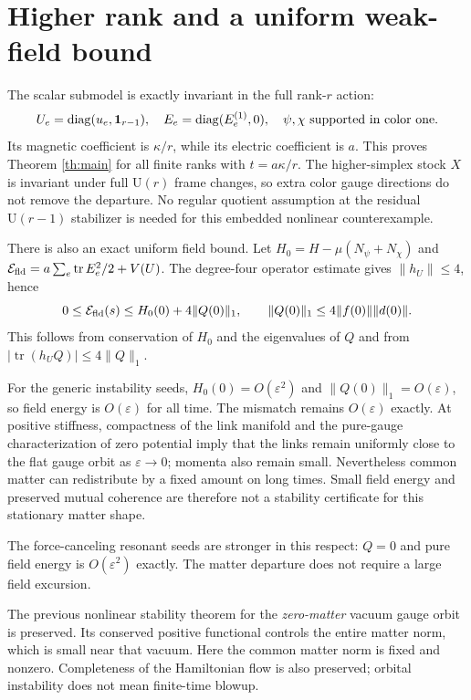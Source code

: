 \documentclass[11pt,a4paper]{article}
\newcommand{\tr}{\operatorname{tr}}\newcommand{\Rea}{\operatorname{Re}}\newcommand{\U}{\mathrm U}
\newcommand{\id}{\mathbf1}\newcommand{\dd}{\mathrm d}\newcommand{\diag}{\operatorname{diag}}
\begin{document}
\newpage
\section{Higher rank and a uniform weak-field bound}
The scalar submodel is exactly invariant in the full rank-$r$ action:
\[
U_e=\diag(u_e,\id_{r-1}),\quad E_e=\diag(E_e^{(1)},0),
\quad\psi,\chi\hbox{ supported in color one}.
\]
Its magnetic coefficient is $\kappa/r$, while its electric coefficient is $a$. This proves Theorem \ref{th:main} for all finite ranks with $t=a\kappa/r$. The higher-simplex stock $X$ is invariant under full $\U(r)$ frame changes, so extra color gauge directions do not remove the departure. No regular quotient assumption at the residual $\U(r-1)$ stabilizer is needed for this embedded nonlinear counterexample.

There is also an exact uniform field bound. Let $H_0=H-\mu(N_\psi+N_\chi)$ and $\mathcal E_{\rm fld}=a\sum_e\tr E_e^2/2+V(U)$. The degree-four operator estimate gives $\|h_U\|\leq4$, hence
\begin{equation}
0\leq\mathcal E_{\rm fld}(s)
\leq H_0(0)+4\|Q(0)\|_1,\qquad
\|Q(0)\|_1\leq4\|f(0)\|\|d(0)\|.\label{eq:fieldbound}
\end{equation}
This follows from conservation of $H_0$ and the eigenvalues of $Q$ and from
$|\tr(h_UQ)|\leq4\|Q\|_1$.

For the generic instability seeds, $H_0(0)=O(\varepsilon^2)$ and $\|Q(0)\|_1=O(\varepsilon)$, so field energy is $O(\varepsilon)$ for all time. The mismatch remains $O(\varepsilon)$ exactly. At positive stiffness, compactness of the link manifold and the pure-gauge characterization of zero potential imply that the links remain uniformly close to the flat gauge orbit as $\varepsilon\to0$; momenta also remain small. Nevertheless common matter can redistribute by a fixed amount on long times. Small field energy and preserved mutual coherence are therefore not a stability certificate for this stationary matter shape.

The force-canceling resonant seeds are stronger in this respect: $Q=0$ and pure field energy is $O(\varepsilon^2)$ exactly. The matter departure does not require a large field excursion.

The previous nonlinear stability theorem for the \emph{zero-matter} vacuum gauge orbit is preserved. Its conserved positive functional controls the entire matter norm, which is small near that vacuum. Here the common matter norm is fixed and nonzero. Completeness of the Hamiltonian flow is also preserved; orbital instability does not mean finite-time blowup.
\end{document}
